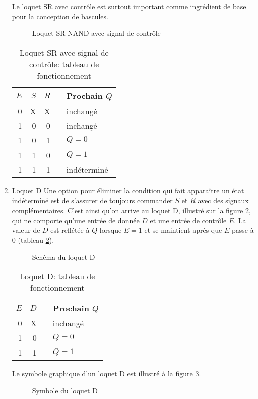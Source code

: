 \documentclass[letter, oneside]{book}
\begin{document}
\begin{enumerate}
Le loquet SR avec contrôle est surtout important comme
ingrédient de base pour la conception de bascules.

\begin{figure}[htbp]
\centering

\caption{\label{fig:orga478069}Loquet SR NAND avec signal de contrôle}
\end{figure}

\begin{table}[htbp]
\caption{\label{tab:orge2c9b88}Loquet SR avec signal de contrôle: tableau de fonctionnement}
\centering
\begin{tabular}{rrrll}
\(E\) & \(S\) & \(R\) &  & Prochain \(Q\)\\[0pt]
\hline
0 & X & X &  & inchangé\\[0pt]
1 & 0 & 0 &  & inchangé\\[0pt]
1 & 0 & 1 &  & \(Q = 0\)\\[0pt]
1 & 1 & 0 &  & \(Q = 1\)\\[0pt]
1 & 1 & 1 &  & indéterminé\\[0pt]
\end{tabular}
\end{table}

\item Loquet D
\label{sec:orgb9293a8}
Une option pour éliminer la condition qui fait apparaître un état
indéterminé est de s'assurer de toujours commander \(S\) et \(R\)
avec des signaux complémentaires. C'est ainsi qu'on arrive au loquet
D, illustré sur la figure \ref{fig:org962f868}, qui ne comporte qu'une entrée de
donnée \(D\) et une entrée de contrôle \(E\). La valeur de \(D\) est
reflétée à \(Q\) lorsque \(E=1\) et se maintient après que \(E\) passe
à 0 (tableau \ref{tab:org3c7a542}).

\begin{figure}[htbp]
\centering

\caption{\label{fig:org962f868}Schéma du loquet D}
\end{figure}

\begin{table}[htbp]
\caption{\label{tab:org3c7a542}Loquet D: tableau de fonctionnement}
\centering
\begin{tabular}{rrll}
\(E\) & \(D\) &  & Prochain \(Q\)\\[0pt]
\hline
0 & X &  & inchangé\\[0pt]
1 & 0 &  & \(Q = 0\)\\[0pt]
1 & 1 &  & \(Q = 1\)\\[0pt]
\end{tabular}
\end{table}

Le symbole graphique d'un loquet D est illustré à la figure \ref{fig:org8aedcbe}.

\begin{figure}[htbp]
\centering

\caption{\label{fig:org8aedcbe}Symbole du loquet D}
\end{figure}
\end{enumerate}
\end{document}
